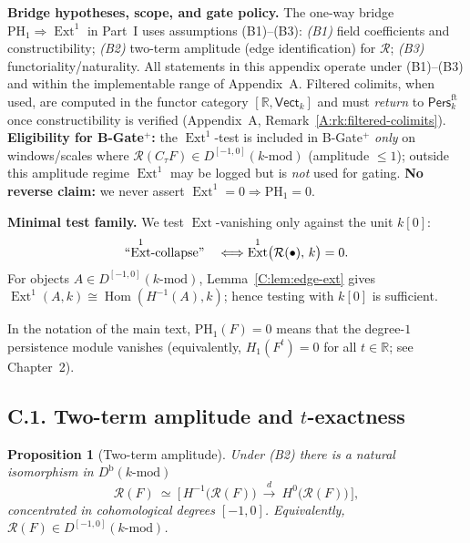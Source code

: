 \documentclass[11pt]{article}
\DeclareMathOperator{\Ext}{Ext}
\DeclareMathOperator{\Hom}{Hom}
\newcommand{\Pers}{\mathsf{Pers}}
\numberwithin{equation}{section}
\newtheorem{proposition}[theorem]{Proposition}
\theoremstyle{definition}
\providecommand{\n}{\unskip\space}
\begin{document}
\medskip
\noindent\textbf{Bridge hypotheses, scope, and gate policy.}
The one-way bridge \(\mathrm{PH}_1\Rightarrow \Ext^1\) in Part~I uses assumptions \textup{(B1)–(B3)}:
\emph{(B1)} field coefficients and constructibility; \emph{(B2)} two-term amplitude (edge identification) for \(\mathcal{R}\); \emph{(B3)} functoriality/naturality.
All statements in this appendix operate under \textup{(B1)–(B3)} and within the implementable range of Appendix~A.
Filtered colimits, when used, are computed in the functor category \([\mathbb{R},\mathsf{Vect}_k]\) and must \emph{return} to \(\Pers^{\mathrm{ft}}_k\) once constructibility is verified (Appendix~A, Remark~\ref{A:rk:filtered-colimits}).
\textbf{Eligibility for B-Gate\(^{+}\):} the \(\Ext^1\)-test is included in B-Gate\(^{+}\) \emph{only} on windows/scales where \(\mathcal{R}(C_\tau F)\in D^{[-1,0]}(k\text{-mod})\) (amplitude \(\le 1\)); outside this amplitude regime \(\Ext^1\) may be logged but is \emph{not} used for gating.
\textbf{No reverse claim:} we never assert \(\Ext^1=0\Rightarrow \mathrm{PH}_1=0\).

\medskip
\noindent\textbf{Minimal test family.}
We test \(\Ext\)-vanishing only against the unit \(k[0]\):
\[
\text{``\(\Ext^1\)-collapse''}\quad\Longleftrightarrow\quad\n\Ext^1\!\big(\mathcal{R}(\bullet),\,k\big)=0.
\]
For objects \(A\in D^{[-1,0]}(k\text{-mod})\), Lemma~\ref{C:lem:edge-ext} gives
\(\Ext^1(A,k)\cong \Hom(H^{-1}(A),k)\); hence testing with \(k[0]\) is sufficient.

In the notation of the main text, \(\mathrm{PH}_1(F)=0\) means that the degree-\(1\) persistence module vanishes (equivalently, \(H_1(F^t)=0\) for all \(t\in\mathbb{R}\); see Chapter~2).

\subsection*{C.1. Two-term amplitude and $t$-exactness}

\begin{proposition}[Two-term amplitude]\label{C:prop:two-term}
Under \textup{(B2)} there is a natural isomorphism in \(D^{\mathrm{b}}(k\text{-mod})\)
\[
\mathcal{R}(F)\ \simeq\ \Big[\, H^{-1}\!\big(\mathcal{R}(F)\big)\ \xrightarrow{\,d\,}\ H^{0}\!\big(\mathcal{R}(F)\big)\,\Big],
\]
concentrated in cohomological degrees \([-1,0]\).
Equivalently, \(\mathcal{R}(F)\in D^{[-1,0]}(k\text{-mod})\).
\end{proposition}
\end{document}
